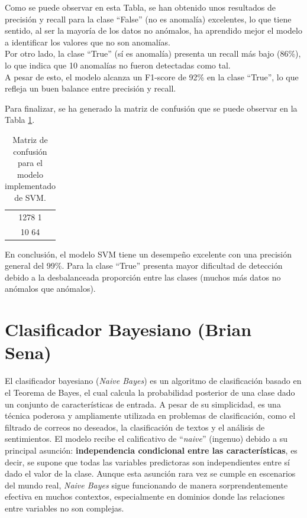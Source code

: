 \documentclass[12pt,letterpaper]{article}
\begin{document}
Como se puede observar en esta Tabla, se han obtenido unos resultados de precisión y recall para la clase ``False'' (no es anomalía) excelentes, lo que tiene sentido, al ser la mayoría de los datos no anómalos, ha aprendido mejor el modelo a identificar los valores que no son anomalías.\\
Por otro lado, la clase ``True'' (sí es anomalía) presenta un recall más bajo (86\%), lo que indica que 10 anomalías no fueron detectadas como tal.\\
A pesar de esto, el modelo alcanza un F1-score de 92\% en la clase ``True'', lo que refleja un buen balance entre precisión y recall.

Para finalizar, se ha generado la matriz de confusión que se puede observar en la Tabla \ref{tab:confusion-SVM}.
\begin{table}[H]
    \centering
    \begin{tabular}{|c|}
    \hline
    1278 \hspace{8mm} 1 \\ 
    10 \hspace{10mm} 64 \\ \hline
    \end{tabular}
    \caption{Matriz de confusión para el modelo implementado de SVM.}
    \label{tab:confusion-SVM}
\end{table}

En conclusión, el modelo SVM tiene un desempeño excelente con una precisión general del 99\%. Para la clase ``True'' presenta mayor dificultad de detección debido a la desbalanceada proporción entre las clases (muchos más datos no anómalos que anómalos).


\section{Clasificador Bayesiano (Brian Sena)}
El clasificador bayesiano (\textit{Naive Bayes}) es un algoritmo de clasificación basado en el Teorema de Bayes, el cual calcula la probabilidad posterior de una clase dado un conjunto de características de entrada. 
A pesar de su simplicidad, es una técnica poderosa y ampliamente utilizada en problemas de clasificación, como el filtrado de correos no deseados, la clasificación de textos y el análisis de sentimientos.
El modelo recibe el calificativo de ``\textit{naive}'' (ingenuo) debido a su principal asunción: \textbf{independencia condicional entre las características}, es decir, se supone que todas las variables predictoras son independientes entre sí dado el valor de la clase. 
Aunque esta asunción rara vez se cumple en escenarios del mundo real, \textit{Naive Bayes} sigue funcionando de manera sorprendentemente efectiva en muchos contextos, especialmente en dominios donde las relaciones entre variables no son complejas.
\end{document}
